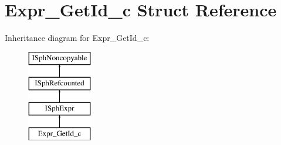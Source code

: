 \hypertarget{structExpr__GetId__c}{\section{Expr\-\_\-\-Get\-Id\-\_\-c Struct Reference}
\label{structExpr__GetId__c}
}
Inheritance diagram for Expr\-\_\-\-Get\-Id\-\_\-c\-:\begin{figure}[H]
\begin{center}
\leavevmode
\includegraphics[height=4.000000cm]{structExpr__GetId__c}
\end{center}
\end{figure}
